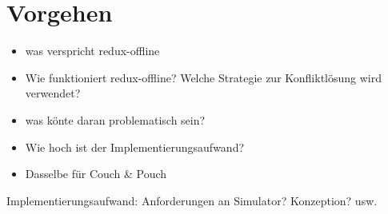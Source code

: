 \chapter{\label{chap:implementierung}Vorgehen}
\begin{itemize}
	\item was verspricht redux-offline
	\item Wie funktioniert redux-offline? Welche Strategie zur Konfliktlösung wird verwendet?
	\item was könte daran problematisch sein?
	\item Wie hoch ist der Implementierungsaufwand?
	\item Dasselbe für Couch \& Pouch
\end{itemize}

Implementierungsaufwand: Anforderungen an Simulator? Konzeption? usw.
